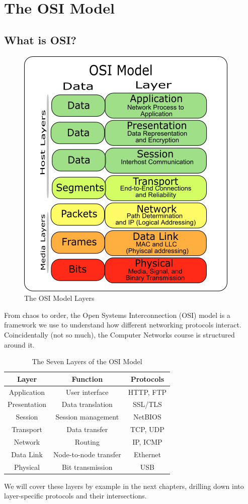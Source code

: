 \chapter{The OSI Model}\label{sec:osi_intro}
\section{What is OSI?}
\begin{figure}[h]
    \centering
    \includegraphics[width=.3\textwidth]{assets/osi/layers.png}
    \caption{The OSI Model Layers}\label{fig:osi_layers_intro}
\end{figure}
From chaos to order, the Open Systems Interconnection (OSI) model is a framework we use to understand how different networking protocols interact. Coincidentally (not so much), the Computer Networks course is structured around it.

\begin{table}[h]
    \centering
    \begin{tabular}{|c|c|c|}
        \hline
        \textbf{Layer} & \textbf{Function} & \textbf{Protocols} \\
        \hline
        Application & User interface & HTTP, FTP \\
        Presentation & Data translation & SSL/TLS \\
        Session & Session management & NetBIOS \\
        Transport & Data transfer & TCP, UDP \\
        Network & Routing & IP, ICMP \\
        Data Link & Node-to-node transfer & Ethernet \\
        Physical & Bit transmission & USB \\
        \hline
        \end{tabular}
    \caption{The Seven Layers of the OSI Model}\label{tab:osi_layers}
\end{table}

We will cover these layers by example in the next chapters, drilling down into layer-specific protocols and their intersections.
